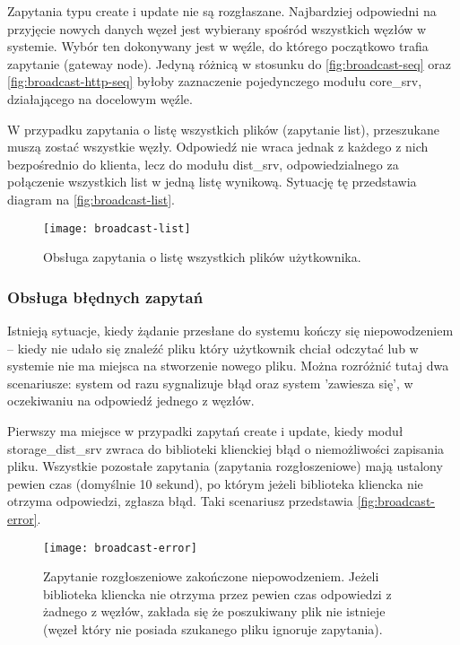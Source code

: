 Zapytania typu create i update nie są rozgłaszane. Najbardziej odpowiedni na przyjęcie nowych danych węzeł jest wybierany spośród wszystkich węzłów w systemie. Wybór ten dokonywany jest w węźle, do którego początkowo trafia zapytanie (gateway node). Jedyną różnicą w stosunku do \autoref{fig:broadcast-seq} oraz \autoref{fig:broadcast-http-seq} byłoby zaznaczenie pojedynczego modułu core\_srv, działającego na docelowym węźle.

W przypadku zapytania o listę wszystkich plików (zapytanie list), przeszukane muszą zostać wszystkie węzły. Odpowiedź nie wraca jednak z każdego z nich bezpośrednio do klienta, lecz do modułu dist\_srv, odpowiedzialnego za połączenie wszystkich list w jedną listę wynikową. Sytuację tę przedstawia diagram na \autoref{fig:broadcast-list}.

\begin{figure}[!htbp]
	\centering
	\texttt{[image: broadcast-list]}
	\caption[Zapytanie o listę plików.]{Obsługa zapytania o listę wszystkich plików użytkownika.}
	\label{fig:broadcast-list}
\end{figure}

\subsubsection{Obsługa błędnych zapytań}
Istnieją sytuacje, kiedy żądanie przesłane do systemu kończy się niepowodzeniem – kiedy nie udało się znaleźć pliku który użytkownik chciał odczytać lub w systemie nie ma miejsca na stworzenie nowego pliku. Można rozróżnić tutaj dwa scenariusze: system od razu sygnalizuje błąd oraz system 'zawiesza się', w oczekiwaniu na odpowiedź jednego z węzłów. 

Pierwszy ma miejsce w przypadki zapytań create i update, kiedy moduł storage\_dist\_srv zwraca do biblioteki klienckiej błąd o niemożliwości zapisania pliku. Wszystkie pozostałe zapytania (zapytania rozgłoszeniowe) mają ustalony pewien czas (domyślnie 10 sekund), po którym jeżeli biblioteka kliencka nie otrzyma odpowiedzi, zgłasza błąd. Taki scenariusz przedstawia \autoref{fig:broadcast-error}.

\begin{figure}[!htbp]
	\centering
	\texttt{[image: broadcast-error]}
	\caption[Zapytanie zakończone błędem.]{Zapytanie rozgłoszeniowe zakończone niepowodzeniem. Jeżeli biblioteka kliencka nie otrzyma przez pewien czas odpowiedzi z żadnego z węzłów, zakłada się że poszukiwany plik nie istnieje (węzeł który nie posiada szukanego pliku ignoruje zapytania).}
	\label{fig:broadcast-error}
\end{figure}
